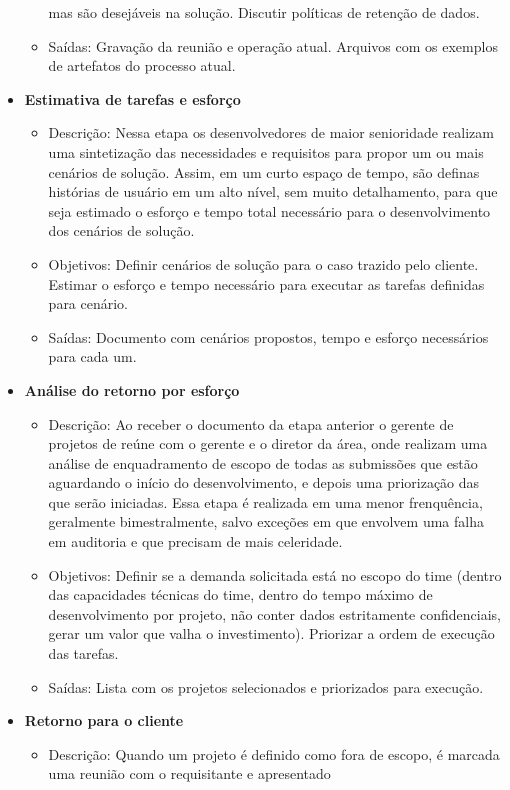 \begin{itemize}
\begin{itemize}
			mas são desejáveis na solução. Discutir políticas de retenção de dados.
			\item Saídas: Gravação da reunião e operação atual. Arquivos com os exemplos de artefatos do processo atual.
		\end{itemize}
		\item \textbf{Estimativa de tarefas e esforço}
		\begin{itemize}
			\item Descrição: Nessa etapa os desenvolvedores de maior senioridade realizam uma sintetização das necessidades e requisitos para propor
			um ou mais cenários de solução. Assim, em um curto espaço de tempo, são definas histórias de usuário em um alto nível, sem muito detalhamento,
			para que seja estimado o esforço e tempo total necessário para o desenvolvimento dos cenários de solução. 
			\item Objetivos: Definir cenários de solução para o caso trazido pelo cliente. Estimar o esforço e tempo necessário para executar as tarefas definidas para cenário.
			\item Saídas: Documento com cenários propostos, tempo e esforço necessários para cada um. 
		\end{itemize}
		\item \textbf{Análise do retorno por esforço}
		\begin{itemize}
			\item Descrição: Ao receber o documento da etapa anterior o gerente de projetos de reúne com o gerente e o diretor da área,
			onde realizam uma análise de enquadramento de escopo de todas as submissões que estão aguardando o início do desenvolvimento, e 
			depois uma priorização das que serão iniciadas. Essa etapa é realizada em uma menor frenquência,
			geralmente bimestralmente, salvo exceções em que envolvem uma falha em auditoria e que precisam de mais celeridade.
			\item Objetivos: Definir se a demanda solicitada está no escopo do time (dentro das capacidades técnicas do time, dentro do tempo máximo de desenvolvimento por projeto, não conter
			dados estritamente confidenciais, gerar um valor que valha o investimento). Priorizar a ordem de execução das tarefas.
			\item Saídas: Lista com os projetos selecionados e priorizados para execução.
		\end{itemize}
		\item \textbf{Retorno para o cliente}
		\begin{itemize}
			\item Descrição: Quando um projeto é definido como fora de escopo, é marcada uma reunião com o requisitante e apresentado 

\end{itemize}
\end{itemize}
